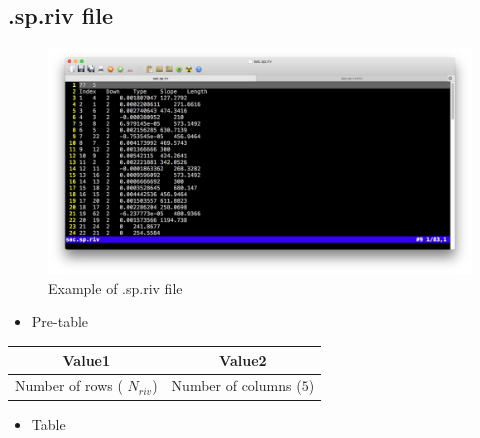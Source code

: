 \documentclass[]{scrbook}
\providecommand{\tightlist}{%
  \setlength{\itemsep}{0pt}\setlength{\parskip}{0pt}}
\begin{document}
\subsection{.sp.riv file}\label{sp.riv-file}

\begin{figure}
\centering
\includegraphics{Fig/IO/sp.riv.png}
\caption{Example of .sp.riv file}
\end{figure}

\begin{itemize}
\tightlist
\item
  Pre-table
\end{itemize}

\begin{longtable}[]{@{}cc@{}}
\toprule
Value1 & Value2\tabularnewline
\midrule
\endhead
Number of rows ( \(N_{riv}\)) & Number of columns (\(5\))\tabularnewline
\bottomrule
\end{longtable}

\begin{itemize}
\tightlist
\item
  Table
\end{itemize}
\end{document}
